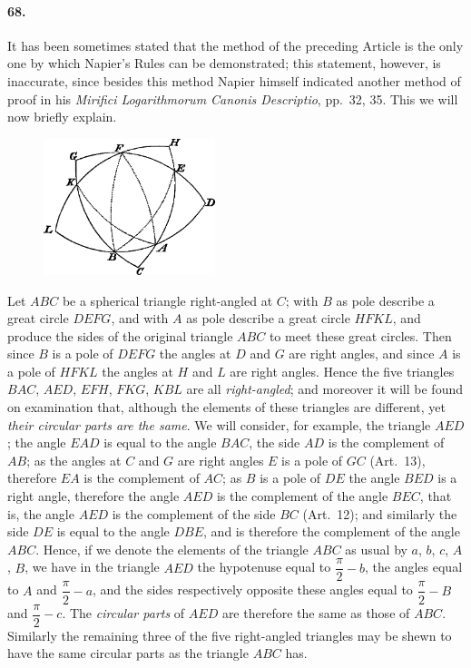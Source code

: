 \documentclass{book}[2004/02/16]
\begin{document}
\begin{mainmatter}
\begin{spacing}{1.3}
\paragraph{68.} It has been sometimes stated that the method of the
preceding Article is the only one by which Napier's Rules can be
demonstrated; this statement, however, is inaccurate, since besides
this method Napier himself indicated another method of proof in
his \textit{Mirifici Logarithmorum Canonis Descriptio}, pp.\ 32, 35. This
we will now briefly explain.
\begin{figure}[htp]
\centering
\includegraphics[width=5.0cm]{images/048fc}
\end{figure}

Let $ABC$ be a spherical triangle right-angled at $C$; with $B$
as pole describe a great circle $DEFG$, and with $A$ as pole describe
a great circle $HFKL$, and produce the sides of the original triangle
$ABC$ to meet these great circles. Then since $B$ is a pole of $DEFG$
the angles at $D$ and $G$ are right angles, and since $A$ is a pole of
$HFKL$ the angles at $H$ and $L$ are right angles. Hence the five
triangles $BAC$, $AED$, $EFH$, $FKG$, $KBL$ are all \textit{right-angled}; and
moreover it will be found on examination that, although the elements
of these triangles are different, yet \textit{their circular parts are
the same}. We will consider, for example, the triangle $AED$; the
angle $EAD$ is equal to the angle $BAC$, the side $AD$ is the complement
of $AB$; as the angles at $C$ and $G$ are right angles $E$ is a
pole of $GC$ (Art.~13), therefore $EA$ is the complement of $AC$; as
$B$ is a pole of $DE$ the angle $BED$ is a right angle, therefore the
angle $AED$ is the complement of the angle $BEC$, that is, the
angle $AED$ is the complement of the side $BC$ (Art.~12); and similarly
the side $DE$ is equal to the angle $DBE$, and is therefore the
complement of the angle $ABC$. Hence, if we denote the elements
of the triangle $ABC$ as usual by $a$, $b$, $c$, $A$, $B$, we have in the
triangle $AED$ the hypotenuse equal to $\dfrac{\pi}{2} - b$, the angles equal to
$A$ and $\dfrac{\pi}{2} - a$, and the sides respectively opposite these angles equal
to $\dfrac{\pi}{2} - B$ and $\dfrac{\pi}{2} - c$. The \textit{circular parts} of $AED$ are therefore the
same as those of $ABC$. Similarly the remaining three of the five
right-angled triangles may be shewn to have the same circular
parts as the triangle $ABC$ has.


\end{spacing}
\end{mainmatter}
\end{document}
